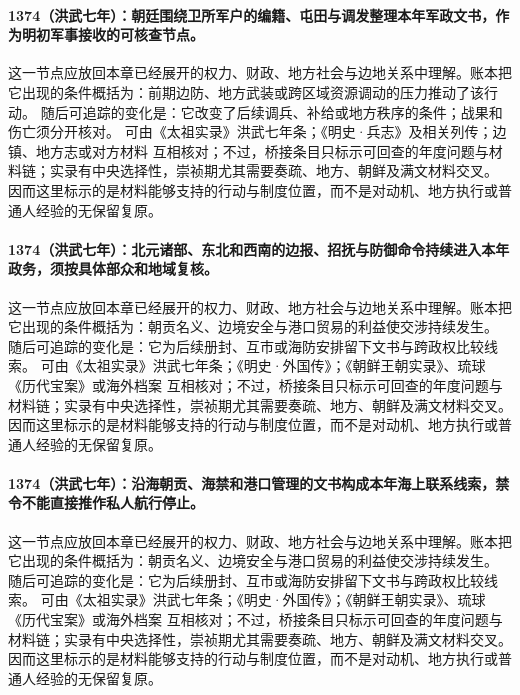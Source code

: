 \paragraph{1374（洪武七年）：朝廷围绕卫所军户的编籍、屯田与调发整理本年军政文书，作为明初军事接收的可核查节点。} 这一节点应放回本章已经展开的权力、财政、地方社会与边地关系中理解。账本把它出现的条件概括为：前期边防、地方武装或跨区域资源调动的压力推动了该行动。 随后可追踪的变化是：它改变了后续调兵、补给或地方秩序的条件；战果和伤亡须分开核对。 可由《太祖实录》洪武七年条；《明史·兵志》及相关列传；边镇、地方志或对方材料 互相核对；不过，桥接条目只标示可回查的年度问题与材料链；实录有中央选择性，崇祯期尤其需要奏疏、地方、朝鲜及满文材料交叉。 因而这里标示的是材料能够支持的行动与制度位置，而不是对动机、地方执行或普通人经验的无保留复原。

\paragraph{1374（洪武七年）：北元诸部、东北和西南的边报、招抚与防御命令持续进入本年政务，须按具体部众和地域复核。} 这一节点应放回本章已经展开的权力、财政、地方社会与边地关系中理解。账本把它出现的条件概括为：朝贡名义、边境安全与港口贸易的利益使交涉持续发生。 随后可追踪的变化是：它为后续册封、互市或海防安排留下文书与跨政权比较线索。 可由《太祖实录》洪武七年条；《明史·外国传》；《朝鲜王朝实录》、琉球《历代宝案》或海外档案 互相核对；不过，桥接条目只标示可回查的年度问题与材料链；实录有中央选择性，崇祯期尤其需要奏疏、地方、朝鲜及满文材料交叉。 因而这里标示的是材料能够支持的行动与制度位置，而不是对动机、地方执行或普通人经验的无保留复原。

\paragraph{1374（洪武七年）：沿海朝贡、海禁和港口管理的文书构成本年海上联系线索，禁令不能直接推作私人航行停止。} 这一节点应放回本章已经展开的权力、财政、地方社会与边地关系中理解。账本把它出现的条件概括为：朝贡名义、边境安全与港口贸易的利益使交涉持续发生。 随后可追踪的变化是：它为后续册封、互市或海防安排留下文书与跨政权比较线索。 可由《太祖实录》洪武七年条；《明史·外国传》；《朝鲜王朝实录》、琉球《历代宝案》或海外档案 互相核对；不过，桥接条目只标示可回查的年度问题与材料链；实录有中央选择性，崇祯期尤其需要奏疏、地方、朝鲜及满文材料交叉。 因而这里标示的是材料能够支持的行动与制度位置，而不是对动机、地方执行或普通人经验的无保留复原。


